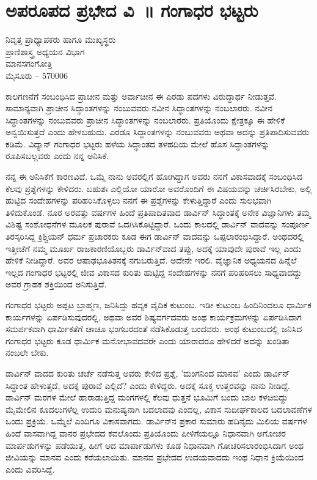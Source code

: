 {\fontsize{14}{16}\selectfont
\chapter{ಅಪರೂಪದ ಪ್ರಭೇದ ವಿ~॥ ಗಂಗಾಧರ ಭಟ್ಟರು}

\begin{center}
\smallskip

ನಿವೃತ್ತ ಪ್ರಾಧ್ಯಾಪಕರು ಹಾಗೂ ಮುಖ್ಯಸ್ಥರು\\
ಪ್ರಾಣಿಶಾಸ್ತ್ರ ಅಧ್ಯಯನ ವಿಭಾಗ\\ 
ಮಾನಸಗಂಗೋತ್ರಿ\\ 
ಮೈಸೂರು – 570006
\addrule
\end{center}

ಕಾಲಗಣನೆಗೆ ಸಂಬಂಧಿಸಿದ ಪ್ರಾಚೀನ ಮತ್ತು ಅರ್ವಾಚೀನ ಈ ಎರಡು ಪದಗಳು ವಿರುದ್ಧಾರ್ಥ ನೀಡುತ್ತವೆ.  ಸಾಮಾನ್ಯವಾಗಿ ಪ್ರಾಚೀನ ಸಿದ್ಧಾಂತಗಳನ್ನು ನಂಬುವವರು ನವೀನ ಸಿದ್ಧಾಂತಗಳನ್ನು ನಂಬಲಾರರು.  ನವೀನ ಸಿದ್ಧಾಂತಗಳನ್ನು ನಂಬುವವರು ಪ್ರಾಚೀನ ಸಿದ್ಧಾಂತಗಳನ್ನು ನಂಬಲಾರರು.  ಪ್ರತಿಯೊಂದು ಕ್ಷೇತ್ರಕ್ಕೂ ಈ ಹೇಳಿಕೆ ಅನ್ವಯಿಸುತ್ತದೆ ಎಂದು ಹೇಳಬಹುದು.  ಎರಡೂ ಸಿದ್ಧಾಂತಗಳನ್ನು ನಂಬುವವರು ಅಥವಾ ಅದನ್ನು ಪ್ರತಿಪಾದಿಸುವವರು ಕಡಿಮೆ.  ವಿದ್ಯಾನ್ ಗಂಗಾಧರ ಭಟ್ಟರು ಹಳೆಯ ಸಿದ್ಧಾಂತದ ತಳಹದಿಯ ಮೇಲೆ ಹೊಸ ಸಿದ್ಧಾಂತಗಳನ್ನು ರೂಪಿಸಬಲ್ಲವರು ಎಂದು ನನ್ನ ಅನಿಸಿಕೆ.  

ನನ್ನ ಈ ಅನಿಸಿಕೆಗೆ ಕಾರಣವಿದೆ.  ಒಮ್ಮೆ ನಾನು ಅವರಲ್ಲಿಗೆ ಹೋಗಿದ್ದಾಗ ಅವರು ನನಗೆ ವಿಕಾಸವಾದಕ್ಕೆ ಸಂಬಂಧಿಸಿದ ಕೆಲವು ಪ್ರಶ್ನೆಗಳನ್ನು ಕೇಳಿದರು.  ಬಹುಶಃ ಎಲ್ಲಿಯೋ ಯಾರೋ ಅವರೊಂದಿಗೆ ಈ ವಿಷಯವನ್ನು ಚರ್ಚಿಸಿರಬೇಕು, ಅಲ್ಲಿ ಹುಟ್ಟಿದ ಸಂದೇಹಗಳನ್ನು ಪರಿಹರಿಸಿಕೊಳ್ಳಲು ನನಗೆ ಈ ಪ್ರಶ್ನೆಗಳನ್ನು ಕೇಳುತ್ತಿದ್ದಾರೆ ಎಂದು ಸುಲಭವಾಗಿ ತಿಳಿದುಕೊಂಡೆ.  ನೂರ ಅರವತ್ತು ವರ್ಷಗಳ ಹಿಂದೆ ಪ್ರತಿಪಾದಿತವಾದ ಡಾರ್ವಿನ್ ಸಿದ್ಧಾಂತಕ್ಕೆ ಅನೇಕ ವಿಜ್ಞಾನಿಗಳು ತಮ್ಮ ವಿಶಿಷ್ಟ ಸಂಶೋಧನೆಗಳ ಮೂಲಕ ಪುರಾವೆ ಒದಗಿಸಿಕೊಟ್ಟಿದ್ದಾರೆ.  ಒಂದು ಕಾಲದಲ್ಲಿ ಡಾರ್ವಿನ್ ವಾದವನ್ನು ಸಂಪೂರ್ಣ ತಿರಸ್ಕರಿಸಿದ್ದ ಕ್ರಿಶ್ಚಿಯನ್ ಧರ್ಮ ಪ್ರಚಾರಕರು ಕೂಡ ಈಗ ಡಾರ್ವಿನ್ ವಾದವನ್ನು ಒಪ್ಪಲಾರಂಭಿಸಿದ್ದಾರೆ.  ಅಂಥದರಲ್ಲಿ ಇತ್ತೀಚೆಗೆ ನಮ್ಮ ಮೂರ್ಖ ರಾಜಕಾರಣಿಯೊಬ್ಬರು ಡಾರ್ವಿನ್‍ವಾದ ತಪ್ಪು, ಅದಕ್ಕೆ ಯಾವುದೇ ಪುರಾವೆ ಇಲ್ಲ ಎಂದು ಹೇಳಿಕೆ ನೀಡಿದ್ದಾರೆ.  ಅವರ ಆಷಾಢಭೂತಿತನಕ್ಕೆ ನಗುಬರುತ್ತಿದೆ.  ಅದೇನೇ ಇರಲಿ.  ವೈಜ್ಞಾನಿಕ ಅಧ್ಯಯನದ ಹಿನ್ನೆಲೆ ಇಲ್ಲದ ಗಂಗಾಧರ ಭಟ್ಟರಲ್ಲಿ ಜೀವ ವಿಕಾಸದ ಕುರಿತು ಹುಟ್ಟಿದ್ದ ಸಂದೇಹಗಳನ್ನು ನನಗೆ ಪರಿಹರಿಸಲು ಸಾಧ್ಯವಾದದ್ದು ಅವರ ಗ್ರಾಹಕ ಶಕ್ತಿಯಿಂದ ಅನಿಸುತ್ತಿದೆ.  

ಗಂಗಾಧರ ಭಟ್ಟರು ಅಪ್ಪಟ ಬ್ರಾಹ್ಮಣ, ಜನಿಸಿದ್ದು ಹವ್ಯಕ ವೈದಿಕ ಕುಟುಂಬ.  ಇಡೀ ಕುಟುಂಬ ಹಿಂದಿನಿಂದಲೂ ಧಾರ್ಮಿಕ ಕಾರ್ಯಗಳನ್ನು ಏರ್ಪಡಿಸುವುದರಲ್ಲಿ, ಅಥವಾ ಅವರ ಶಿಷ್ಯವರ್ಗದವರು ಅಂಥ ಕಾರ್ಯಕ್ರಮಗಳನ್ನು ಏರ್ಪಡಿಸಿದಾಗ ಸಮರ್ಪಕವಾಗಿ ಧಾರ್ಮಿಕತೆಗೆ ಚಾಚೂ ಭಂಗಬರದಂತೆ ನಡೆಸಿಕೊಡುತ್ತ ಬಂದವರು.  ಅಂಥ ಕುಟುಂಬದಲ್ಲಿ ಜನಿಸಿದ ಗಂಗಾಧರ ಭಟ್ಟರು ಕೂಡ ಧಾರ್ಮಿಕ ಮನೋಭಾವದವರೇ ಎಂದು ಯಾರಾದರೂ ಹೇಳಿದರೆ ಅದನ್ನು ಖಂಡಿತಾ ನಂಬಲೇ ಬೇಕು.  

ಡಾರ್ವಿನ್ ವಾದದ ಕುರಿತು ಚರ್ಚೆ ನಡೆಸುತ್ತ ಅವರು ಕೇಳಿದ ಪ್ರಶ್ನೆ, 'ಮಂಗನಿಂದ ಮಾನವ' ಎಂದು ಡಾರ್ವಿನ್ ಸಿದ್ಧಾಂತ ಹೇಳುತ್ತದೆ, ಅದಕ್ಕೆ ಪುರಾವೆ ಎಲ್ಲಿದೆ?  ಎಂದು ಕೇಳಿದ್ದರು.  ಅದಕ್ಕೆ ಸೂಕ್ತ ಉತ್ತರವನ್ನು ನಾನು ನೀಡಿದ್ದೆ.  ಡಾರ್ವಿನ್ ಮರಗಳ ಮೇಲೆ ಹಾರಾಡುತ್ತಿದ್ದ ಮಂಗಗಳಲ್ಲಿ ಕೆಲವು ಧುತ್ತನೆ ಭೂಮಿಗೆ ಬಂದು ಬಾಲ ಕಳಚಿಬಿದ್ದು ಮೈಮೇಲಿನ ಕೂದಲುಗಳೆಲ್ಲ ಉದುರಿ ಮನುಷ್ಯನಾಗಿ ಬದಲಾದವು ಎಂದಲ್ಲ,  ವಿಕಾಸ ಸುದೀರ್ಘಕಾಲದ ಬದಲಾವಣೆಗಳ ಒಂದು ಪ್ರಕ್ರಿಯೆ.  ಒಮ್ಮೆಲೆ ಎಂದಿಗೂ ವಿಕಾಸವಾಗದು.  ಡಾರ್ವಿನ್‍ನ ಪ್ರಕಾರ ಸುಮಾರು ಹದಿನೈದು ಮಿಲಿಯ ವರ್ಷಗಳ ಹಿಂದೆ ವಾಸವಾಗಿದ್ದ ವಾನರ ಪ್ರಭೇದದ ಕವಲೊಂದು ಪ್ರತಿಯೊಂದು ಪೀಳಿಗೆಯಲ್ಲೂ ನಿಧಾನವಾಗಿ ಅಗೋಚರ  ಮಾರ್ಪಡುಗಳನ್ನು ಪಡೆಯುತ್ತ, ಹೀಗೆ ಆದ ಮಾರ್ಪಾಡುಗಳು ಕೂಡ ನಿಧಾನವಾಗಿ ಗೋಚರಿಸಲಾರಂಭಿಸಿದಾಗ ಅಂಥ ಜೀವಿಯನ್ನು ಮಾನವ ಎಂದು ಕರೆಯಲಾಯಿತು.  ಮಾನವ ಪ್ರಭೇದದ ಉದಯವಾದದು ಇಂಥ ನಿಧಾನ ಕ್ರಿಯೆಯಿಂದ ಎಂದು ವಿವರಿಸಿದ್ದೆ.  

}
